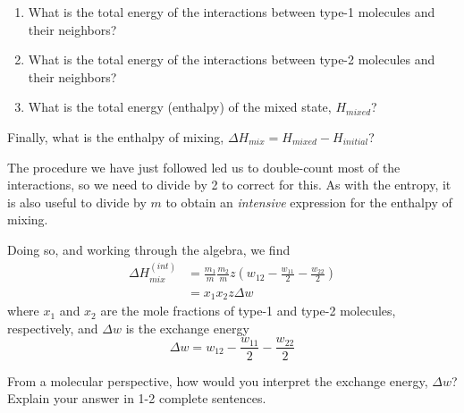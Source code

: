 \begin{activity}
\begin{ctqs}
		\begin{enumerate}
			\item What is the total energy of the interactions between type-1 molecules and their neighbors?
			
				\begin{solution}[1in]
				\end{solution}
				
			\item What is the total energy of the interactions between type-2 molecules and their neighbors?
			
				\begin{solution}[1in]
				\end{solution}
				
			\item What is the total energy (enthalpy) of the mixed state, $H_{mixed}$?
			
				\begin{solution}[1in]
				\end{solution}
				
		\end{enumerate}
		
	\question Finally, what is the enthalpy of mixing, $\Delta H_{mix} = H_{mixed} - H_{initial}$?
	
		\begin{solution}[1 in]
		\end{solution}
		
	\question The procedure we have just followed led us to double-count most of the interactions, so we need to divide by 2 to correct for this.  As with the entropy, it is also useful to divide by $m$ to obtain an \emph{intensive} expression for the enthalpy of mixing.
	
		Doing so, and working through the algebra, we find
		\begin{align*}
			\Delta H_{mix}^{(int)} &= \frac{m_1}{m}\frac{m_2}{m} z \left( w_{12} - \frac{w_{11}}{2} - \frac{w_{22}}{2}\right) \\
				&= x_1 x_2 z \Delta w
		\end{align*}
		where $x_1$ and $x_2$ are the mole fractions of type-1 and type-2 molecules, respectively, and $\Delta w$ is the exchange energy
		\begin{equation*}
			\Delta w = w_{12} - \frac{w_{11}}{2} - \frac{w_{22}}{2}
		\end{equation*}
		
		From a molecular perspective, how would you interpret the exchange energy, $\Delta w$?  Explain your answer in 1-2 complete sentences.
		

\end{ctqs}
\end{activity}
